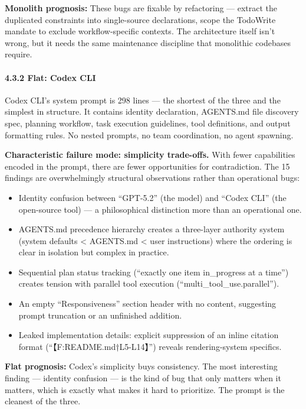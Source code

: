 \documentclass[
]{article}
\providecommand{\tightlist}{%
  \setlength{\itemsep}{0pt}\setlength{\parskip}{0pt}}
\begin{document}
\textbf{Monolith prognosis:} These bugs are fixable by refactoring ---
extract the duplicated constraints into single-source declarations,
scope the TodoWrite mandate to exclude workflow-specific contexts. The
architecture itself isn't wrong, but it needs the same maintenance
discipline that monolithic codebases require.

\hypertarget{flat-codex-cli}{%
\paragraph{4.3.2 Flat: Codex CLI}\label{flat-codex-cli}}

Codex CLI's system prompt is 298 lines --- the shortest of the three and
the simplest in structure. It contains identity declaration, AGENTS.md
file discovery spec, planning workflow, task execution guidelines, tool
definitions, and output formatting rules. No nested prompts, no team
coordination, no agent spawning.

\textbf{Characteristic failure mode: simplicity trade-offs.} With fewer
capabilities encoded in the prompt, there are fewer opportunities for
contradiction. The 15 findings are overwhelmingly structural
observations rather than operational bugs:

\begin{itemize}
\tightlist
\item
  Identity confusion between ``GPT-5.2'' (the model) and ``Codex CLI''
  (the open-source tool) --- a philosophical distinction more than an
  operational one.
\item
  AGENTS.md precedence hierarchy creates a three-layer authority system
  (system defaults \textless{} AGENTS.md \textless{} user instructions)
  where the ordering is clear in isolation but complex in practice.
\item
  Sequential plan status tracking (``exactly one item in\_progress at a
  time'') creates tension with parallel tool execution
  (``multi\_tool\_use.parallel'').
\item
  An empty ``Responsiveness'' section header with no content, suggesting
  prompt truncation or an unfinished addition.
\item
  Leaked implementation details: explicit suppression of an inline
  citation format (``【F:README.md†L5-L14】'') reveals rendering-system
  specifics.
\end{itemize}

\textbf{Flat prognosis:} Codex's simplicity buys consistency. The most
interesting finding --- identity confusion --- is the kind of bug that
only matters when it matters, which is exactly what makes it hard to
prioritize. The prompt is the cleanest of the three.
\end{document}
